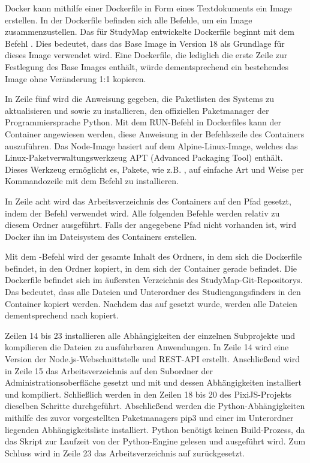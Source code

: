 Docker kann mithilfe einer Dockerfile in Form eines Textdokuments ein Image erstellen. In der Dockerfile befinden sich alle Befehle, um ein Image zusammenzustellen. \parencite{docker_inc_dockerfile_2024} Das für StudyMap entwickelte Dockerfile beginnt mit dem Befehl . Dies bedeutet, dass das Base Image  in Version 18 als Grundlage für dieses Image verwendet wird. Eine Dockerfile, die lediglich die erste Zeile zur Festlegung des Base Images enthält, würde dementsprechend ein bestehendes Image ohne Veränderung 1:1 kopieren. \parencite{the_nodejs_docker_team_node_2024}

In Zeile fünf wird die Anweisung gegeben, die Paketlisten des Systems zu aktualisieren und  sowie  zu installieren, den offiziellen Paketmanager der Programmiersprache Python. \parencite{the_pip_developers_pip_2024} Mit dem RUN-Befehl in Dockerfiles kann der Container angewiesen werden, diese Anweisung in der Befehlszeile des Containers auszuführen. Das Node-Image basiert auf dem Alpine-Linux-Image, welches das Linux-Paketverwaltungswerkzeug APT (Advanced Packaging Tool) enthält. \parencite{the_nodejs_docker_team_node_2024} Dieses Werkzeug ermöglicht es, Pakete, wie z.B. , auf einfache Art und Weise per Kommandozeile mit dem Befehl  zu installieren. \parencite{canonical_ltd_ubuntu_package_2024}

In Zeile acht wird das Arbeitsverzeichnis des Containers auf den Pfad  gesetzt, indem der Befehl  verwendet wird. Alle folgenden Befehle werden relativ zu diesem Ordner ausgeführt. Falls der angegebene Pfad nicht vorhanden ist, wird Docker ihn im Dateisystem des Containers erstellen. \parencite{docker_inc_dockerfile_2024}

Mit dem -Befehl wird der gesamte Inhalt des Ordners, in dem sich die Dockerfile befindet, in den Ordner kopiert, in dem sich der Container gerade befindet. \parencite{docker_inc_dockerfile_2024} Die Dockerfile befindet sich im äußersten Verzeichnis des StudyMap-Git-Repositorys. Das bedeutet, dass alle Dateien und Unterordner des Studiengangsfinders in den Container kopiert werden. Nachdem das  auf  gesetzt wurde, werden alle Dateien dementsprechend nach  kopiert.

Zeilen 14 bis 23 installieren alle Abhängigkeiten der einzelnen Subprojekte und kompilieren die Dateien zu ausführbaren Anwendungen. In Zeile 14 wird eine Version der Node.js-Webschnittstelle und REST-API erstellt. Anschließend wird in Zeile 15 das Arbeitsverzeichnis auf den Subordner der Administrationsoberfläche gesetzt und mit  und  dessen Abhängigkeiten installiert und kompiliert. Schließlich werden in den Zeilen 18 bis 20 des PixiJS-Projekts dieselben Schritte durchgeführt. Abschließend werden die Python-Abhängigkeiten mithilfe des zuvor vorgestellten Paketmanagers pip3 und einer im Unterordner liegenden Abhängigkeitsliste  installiert. Python benötigt keinen Build-Prozess, da das Skript zur Laufzeit von der Python-Engine gelesen und ausgeführt wird. Zum Schluss wird in Zeile 23 das Arbeitsverzeichnis auf  zurückgesetzt.

